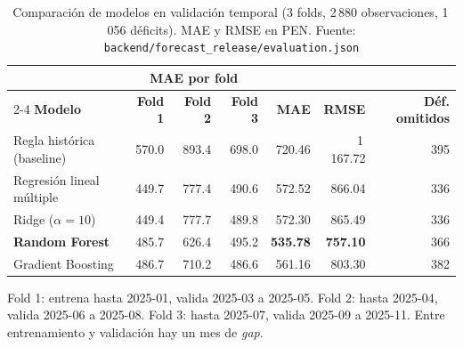 \begin{table}[H]
    \centering
    \small
    \caption{Comparación de modelos en validación temporal (3 folds, 2\,880 observaciones, 1\,056 déficits). MAE y RMSE en PEN. Fuente: \texttt{backend/forecast\_release/evaluation.json}}
    \label{tab:mlops-validacion}
    \begin{tabular}{@{}lrrrrrr@{}}
        \toprule
        & \multicolumn{3}{c}{\textbf{MAE por fold}} & & & \\
        \cmidrule(lr){2-4}
        \textbf{Modelo} & \textbf{Fold 1} & \textbf{Fold 2} & \textbf{Fold 3} & \textbf{MAE} & \textbf{RMSE} & \textbf{Déf. omitidos} \\
        \midrule
        Regla histórica (baseline) & 570.0 & 893.4 & 698.0 & 720.46 & 1\,167.72 & 395 \\
        Regresión lineal múltiple   & 449.7 & 777.4 & 490.6 & 572.52 & 866.04 & 336 \\
        Ridge ($\alpha=10$)         & 449.4 & 777.7 & 489.8 & 572.30 & 865.49 & 336 \\
        \textbf{Random Forest}      & 485.7 & 626.4 & 495.2 & \textbf{535.78} & \textbf{757.10} & 366 \\
        Gradient Boosting           & 486.7 & 710.2 & 486.6 & 561.16 & 803.30 & 382 \\
        \bottomrule
    \end{tabular}

    \vspace{0.3em}
    \footnotesize Fold 1: entrena hasta 2025-01, valida 2025-03 a 2025-05. Fold 2: hasta 2025-04, valida 2025-06 a 2025-08. Fold 3: hasta 2025-07, valida 2025-09 a 2025-11. Entre entrenamiento y validación hay un mes de \textit{gap}.
\end{table}
